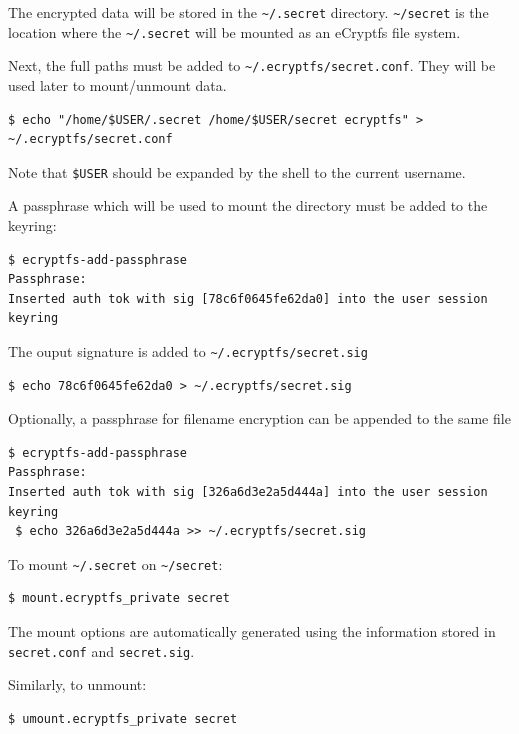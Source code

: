 The encrypted data will be stored in the \texttt{\textasciitilde/.secret} directory.
\texttt{\textasciitilde/secret} is the location where the \texttt{\textasciitilde/.secret} will be mounted as an eCryptfs file system.

Next, the full paths must be added to \texttt{\textasciitilde/.ecryptfs/secret.conf}. They will be used later to mount/unmount data.
\begin{lstlisting}[numbers=none]
$ echo "/home/$USER/.secret /home/$USER/secret ecryptfs" > ~/.ecryptfs/secret.conf
\end{lstlisting}
Note that \texttt{\$USER} should be expanded by the shell to the current username.

A passphrase which will be used to mount the directory must be added to the keyring:
\begin{lstlisting}[numbers=none]
$ ecryptfs-add-passphrase
Passphrase: 
Inserted auth tok with sig [78c6f0645fe62da0] into the user session keyring
\end{lstlisting}

The ouput signature is added to \texttt{\textasciitilde/.ecryptfs/secret.sig}
\begin{lstlisting}[numbers=none]
$ echo 78c6f0645fe62da0 > ~/.ecryptfs/secret.sig
\end{lstlisting}

Optionally, a passphrase for filename encryption can be appended to the same file
\begin{lstlisting}[numbers=none]
$ ecryptfs-add-passphrase
Passphrase: 
Inserted auth tok with sig [326a6d3e2a5d444a] into the user session keyring
 $ echo 326a6d3e2a5d444a >> ~/.ecryptfs/secret.sig
\end{lstlisting}

To mount \texttt{\textasciitilde/.secret} on \texttt{\textasciitilde/secret}:
\begin{lstlisting}[numbers=none]
$ mount.ecryptfs_private secret
\end{lstlisting}
The mount options are automatically generated using the information stored in \texttt{secret.conf} and \texttt{secret.sig}.

Similarly, to unmount:
\begin{lstlisting}[numbers=none]
$ umount.ecryptfs_private secret
\end{lstlisting}
